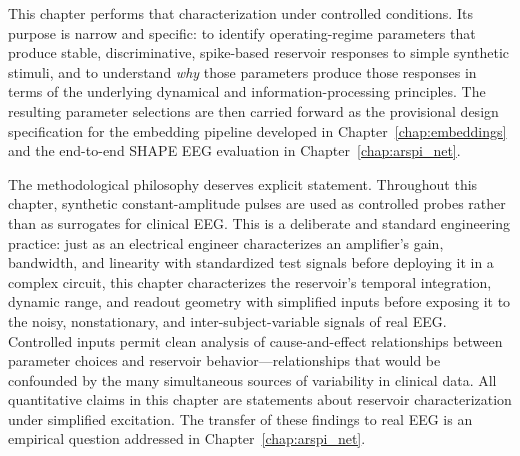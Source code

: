 This chapter performs that characterization under controlled conditions. Its purpose is narrow and specific: to identify operating-regime parameters that produce stable, discriminative, spike-based reservoir responses to simple synthetic stimuli, and to understand \emph{why} those parameters produce those responses in terms of the underlying dynamical and information-processing principles. The resulting parameter selections are then carried forward as the provisional design specification for the embedding pipeline developed in Chapter~\ref{chap:embeddings} and the end-to-end SHAPE EEG evaluation in Chapter~\ref{chap:arspi_net}.

The methodological philosophy deserves explicit statement. Throughout this chapter, synthetic constant-amplitude pulses are used as controlled probes rather than as surrogates for clinical EEG. This is a deliberate and standard engineering practice: just as an electrical engineer characterizes an amplifier's gain, bandwidth, and linearity with standardized test signals before deploying it in a complex circuit, this chapter characterizes the reservoir's temporal integration, dynamic range, and readout geometry with simplified inputs before exposing it to the noisy, nonstationary, and inter-subject-variable signals of real EEG. Controlled inputs permit clean analysis of cause-and-effect relationships between parameter choices and reservoir behavior---relationships that would be confounded by the many simultaneous sources of variability in clinical data. All quantitative claims in this chapter are statements about reservoir characterization under simplified excitation. The transfer of these findings to real EEG is an empirical question addressed in Chapter~\ref{chap:arspi_net}.

